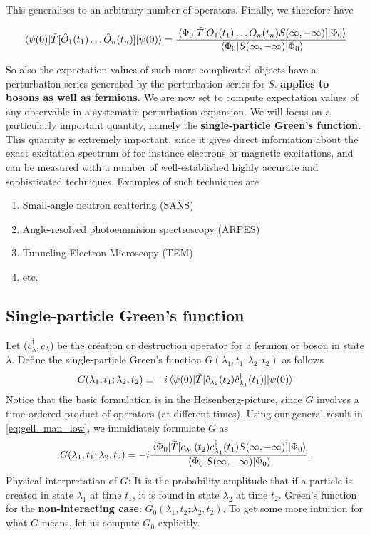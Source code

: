 This generalises to an arbitrary number of operators. Finally, we therefore have 
\begin{tcolorbox}
	\begin{equation}
	\label{eq:gell_man_low}
	\ev{\tilde{T}[\hat O_1(t_1)\dots\hat O_n(t_n)]}{\psi(0)} = \frac{\ev{\tilde{T}[O_1(t_1)\dots O_n(t_n)S(\infty, -\infty)]}{\Phi_0}}{\ev{S(\infty, -\infty)}{\Phi_0}}
	\end{equation}
\end{tcolorbox}
So also the expectation values of such more complicated objects have a perturbation series generated by the perturbation series for $S$.\textbf{  applies to bosons as well as fermions.}
We are now set to compute expectation values of any observable in a systematic perturbation expansion. We will focus on a particularly important quantity, namely the \textbf{single-particle Green's function.} This quantity is extremely important, since it gives direct information about the exact excitation spectrum of for instance electrons or magnetic excitations, and can be measured with a number of well-established highly accurate and sophisticated techniques. Examples of such techniques are 
\begin{enumerate}
	\item Small-angle neutron scattering (SANS)
	\item Angle-resolved photoemmision spectroscopy (ARPES)
	\item Tunneling Electron Microscopy (TEM) 
	\item etc.
\end{enumerate}



\subsection{Single-particle Green's function}
Let ($c_\lambda^\dagger, c_\lambda$) be the creation or destruction operator for a fermion or boson in state $\lambda$. Define the single-particle Green's function $G(\lambda_1, t_1;\lambda_2, t_2)$ as follows
\begin{equation} 
\label{eq:greens_definition}
G(\lambda_1, t_1;\lambda_2, t_2) \equiv -i\ev{\tilde{T}[\hat{c}_{\lambda_2}(t_2)\hat{c}_{\lambda_1}^\dagger(t_1)]}{\psi(0)}
\end{equation}
Notice that the basic formulation is in the Heisenberg-picture, since $G$ involves a time-ordered product of operators (at different times). Using our general result in \cref{eq:gell_man_low}, we immidiately formulate $G$ as
\begin{equation} 
G(\lambda_1, t_1;\lambda_2, t_2) = -i\frac{\ev{\tilde{T}[{c}_{\lambda_2}(t_2){c}_{\lambda_1}^\dagger(t_1)S(\infty, -\infty)]}{\Phi_0}}{\ev{S(\infty, -\infty)}{\Phi_0}}.
\end{equation}
Physical interpretation of $G$: It is the probability amplitude that if a particle is created in state $\lambda_1$ at time $t_1$, it is found in state $\lambda_2$ at time $t_2$. Green's function for the \textbf{non-interacting case}: $G_0(\lambda_1, t_2;\lambda_2, t_2)$. To get some more intuition for what $G$ means, let us compute $G_0$ explicitly. 

